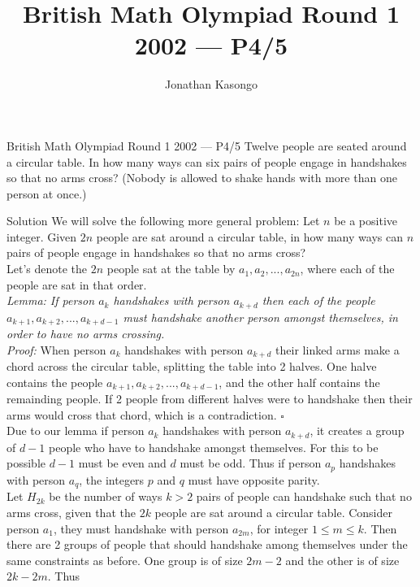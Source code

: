 \documentclass{article}
\author{Jonathan Kasongo}
\title{British Math Olympiad Round 1 2002 --- P4/5}
\begin{document}
\maketitle

\begin{problem}{British Math Olympiad Round 1 2002 --- P4/5}
Twelve people are seated around a circular table. In how many ways
can six pairs of people engage in handshakes so that no arms cross?
(Nobody is allowed to shake hands with more than one person at once.)
\end{problem}

\begin{solution}{Solution}
We will solve the following more general problem: Let $n$ be a positive
integer. Given $2n$ people are sat around a circular table, in how many
ways can $n$ pairs of people engage in handshakes so that no arms cross? \\

Let's denote the $2n$ people sat at the table by $a_1, a_2, ..., a_{2n}$,
where each of the people are sat in that order. \\

\textit{Lemma: If person $a_k$ handshakes with person $a_{k + d}$ then
each of the people $a_{k+1}, a_{k+2}, ..., a_{k + d - 1}$ must handshake
another person amongst themselves, in order to have no arms crossing.} \\

\textit{Proof:} When person $a_k$ handshakes with person $a_{k + d}$ their
linked arms make a chord across the circular table, splitting the table
into 2 halves. One halve contains the people $a_{k+1}, a_{k+2}, ...,
a_{k + d - 1}$, and the other half contains the remainding people. If
2 people from different halves were to handshake then their arms would
cross that chord, which is a contradiction. $\square$ \\

Due to our lemma if person $a_k$ handshakes with person $a_{k+d}$, it
creates a group of $d-1$ people who have to handshake amongst themselves.
For this to be possible $d-1$ must be even and $d$ must be odd. Thus
if person $a_p$ handshakes with person $a_q$, the integers
$p$ and $q$ must have opposite parity. \\

Let $H_{2k}$ be the number of ways $k>2$ pairs of people can handshake such
that no arms cross, given that the $2k$ people are sat around a circular
table. Consider person $a_1$, they must handshake with person $a_{2m}$,
for integer $1 \leq m \leq k$. Then there are 2 groups of people that
should handshake among themselves under the same constraints as before.
One group is of size $2m - 2$ and the other is of size $2k - 2m$.
Thus


\end{solution}
\end{document}
